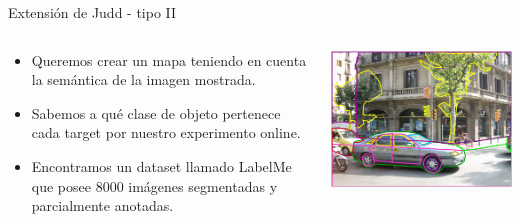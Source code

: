 \documentclass[compress]{beamer}
\begin{document}
\begin{frame}{Extensión de Judd - tipo II}

  \begin{columns}[T]
    \begin{column}{.65\textwidth}
        \begin{itemize}
            \item Queremos crear un mapa teniendo en cuenta la semántica de la imagen mostrada.
            \item Sabemos a qué clase de objeto pertenece cada target por nuestro experimento online. 
            \item Encontramos un dataset llamado LabelMe que posee 8000 imágenes segmentadas y parcialmente anotadas.
        \end{itemize}
    \end{column}
    \begin{column}{.35\textwidth}
        \vspace{0.5cm}
        \begin{center}
        \includegraphics[width=\textwidth]{images/label-me-example.png} 
        \end{center}
    \end{column}
  \end{columns}

\end{frame}
\end{document}
